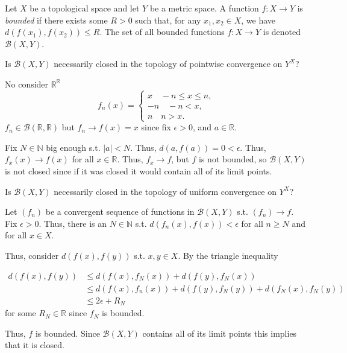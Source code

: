\documentclass[12pt, letterpaper]{article}
\newcommand{\R}{\mathbb{R}}
\newcommand{\N}{\mathbb{N}}
\begin{document}
\begin{problem}{}
    Let $X$ be a topological space and let $Y$ be a metric space. A
  function $f:X \to Y$ is \emph{bounded} if there exists some $R > 0$
  such that, for any $x_1, x_2 \in X$, we have
  $d(f(x_1), f(x_2)) \le R$. The set of all bounded functions
  $f:X \to Y$ is denoted $\mathcal{B}(X,Y)$.
\end{problem}
\begin{subproblem}{}
    Is $\mathcal{B}(X, Y)$ necessarily closed in the topology of
    pointwise convergence on $Y^X$?
\end{subproblem}
\begin{problemproof}
    No consider $\R^\R$
    \begin{equation*}
        f_n(x)=\begin{cases*}
            x \quad -n \leq x \leq n,\\
            -n \quad -n < x,\\
            n \quad n > x.
        \end{cases*}
    \end{equation*}
    $f_n \in \mathcal{B}(\R,\R)$ but $f_n \to f(x)=x$ since fix $\epsilon > 0$, and $a \in \R$.

    Fix $N \in \N$ big enough s.t. $|a| < N$. Thus, $d(a,f(a))=0 < \epsilon$. Thus, $f_x(x) \to f(x)$ for all $x \in \R$. Thus, $f_x \to f$, but $f$ is not bounded, so $\mathcal{B}(X,Y)$ is not closed since if it was closed it would contain all of its limit points.
\end{problemproof}

\begin{subproblem}{}
    Is $\mathcal{B}(X, Y)$ necessarily closed in the topology of
    uniform convergence on $Y^X$?
\end{subproblem}
\begin{problemproof}
    Let $(f_n)$ be a convergent sequence of functions in $\mathcal{B}(X,Y)$ s.t. $(f_n) \to f$. Fix $\epsilon > 0$. Thus, there is an $N \in \N$ s.t. $d(f_n(x),f(x)) < \epsilon$ for all $n \geq N$ and for all $x \in X$.

    Thus, consider $d(f(x),f(y))$ s.t. $x,y \in X$. By the triangle inequality

    \begin{align*}
        d(f(x),f(y)) &\leq d(f(x),f_N(x)) + d(f(y),f_N(x)) \\
        &\leq d(f(x),f_n(x)) + d(f(y),f_N(y)) + d(f_N(x),f_N(y)) \\ &\leq 2\epsilon + R_N
    \end{align*}
    for some $R_N \in \R$ since $f_N$ is bounded.

    Thus, $f$ is bounded. Since $\mathcal{B}(X,Y)$ contains all of its limit points this implies that it is closed.
\end{problemproof}
\end{document}
